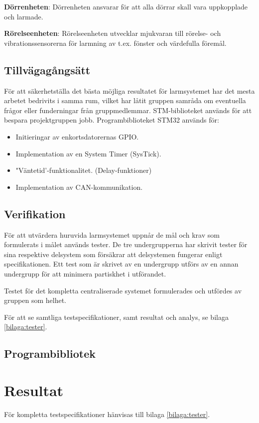 \documentclass{article}
\begin{document}
\textbf{Dörrenheten}: Dörrenheten ansvarar för att alla dörrar skall vara uppkopplade och larmade.

\textbf{Rörelseenheten}: Rörelseenheten utvecklar mjukvaran till
rörelse- och vibrationssensorerna för larmning av t.ex. fönster och värdefulla föremål.


\subsection{Tillvägagångsätt}
\label{tillvägagångsätt}
För att säkerhetställa det bästa möjliga resultatet för larmsystemet har det mesta arbetet bedrivits i samma
rum, vilket har låtit gruppen samråda om eventuella frågor eller funderningar från gruppmedlemmar.
STM-biblioteket används för att bespara projektgruppen jobb.
Programbiblioteket STM32\cite{stm} används för:
\begin{itemize}
    \item Initieringar av enkortsdatorernas GPIO.
    \item Implementation av en System Timer (SysTick).
    \item "Väntetid'-funktionalitet. (Delay-funktioner)
    \item Implementation av CAN-kommunikation.
\end{itemize}

\subsection{Verifikation}
\label{verifikation}
För att utvärdera huruvida larmsystemet uppnår de mål och krav som formulerats i målet används tester.
De tre undergrupperna har skrivit tester för sina respektive delsystem som försäkrar att
delsystemen fungerar enligt specifikationen. Ett test som är skrivet av en undergrupp utförs
av en annan undergrupp för att minimera partiskhet i utförandet.

Testet för det kompletta centraliserade systemet formulerades och utfördes av gruppen som helhet.

För att se samtliga testspecifikationer, samt resultat och analys, se bilaga \ref{bilaga:tester}.


\subsection{Programbibliotek}
\label{stm}



 \section{Resultat}
 För kompletta testspecifikationer hänvisas till bilaga \ref{bilaga:tester}.
\end{document}
